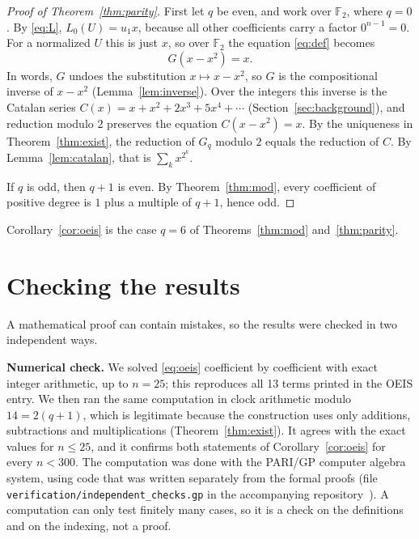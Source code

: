 \documentclass[11pt,a4paper]{article}
\theoremstyle{definition}
\theoremstyle{remark}
\newcommand{\F}{\mathbb{F}}
\newcommand{\para}[1]{\par\medskip\noindent\textbf{#1}\enspace}
\begin{document}
\begin{proof}[Proof of Theorem~\ref{thm:parity}]
First let $q$ be even, and work over $\F_2$, where $q=0$. By \eqref{eq:L}, $L_0(U)=u_1x$, because all other
coefficients carry a factor $0^{n-1}=0$. For a normalized $U$ this is just $x$, so over $\F_2$ the equation
\eqref{eq:def} becomes
\[
G(x-x^2)=x .
\]
In words, $G$ undoes the substitution $x\mapsto x-x^2$, so $G$ is the compositional inverse of $x-x^2$
(Lemma~\ref{lem:inverse}). Over the integers this inverse is the Catalan series $C(x)=x+x^2+2x^3+5x^4+\cdots$
(Section~\ref{sec:background}), and reduction modulo $2$ preserves the equation $C(x-x^2)=x$. By the uniqueness in
Theorem~\ref{thm:exist}, the reduction of $G_q$ modulo $2$ equals the reduction of $C$. By Lemma~\ref{lem:catalan}, that
is $\sum_kx^{2^k}$.

If $q$ is odd, then $q+1$ is even. By Theorem~\ref{thm:mod}, every coefficient of positive degree is $1$ plus a multiple
of $q+1$, hence odd.
\end{proof}


Corollary~\ref{cor:oeis} is the case $q=6$ of Theorems~\ref{thm:mod} and~\ref{thm:parity}.

\section{Checking the results}\label{sec:checks}

A mathematical proof can contain mistakes, so the results were checked in two independent ways.

\para{Numerical check.}
We solved \eqref{eq:oeis} coefficient by coefficient with exact integer arithmetic, up to $n=25$; this
reproduces all 13 terms printed in the OEIS entry. We then ran the same computation in clock
arithmetic modulo $14=2(q+1)$, which is legitimate because the construction uses only additions,
subtractions and multiplications (Theorem~\ref{thm:exist}). It agrees with the exact values for $n\le25$, and it confirms
both statements of Corollary~\ref{cor:oeis} for every $n<300$.
The computation was done with the PARI/GP computer algebra system, using code that was written separately from the
formal proofs (file \texttt{verification/independent\_checks.gp} in the accompanying repository~\cite{repo}).
A computation can only test finitely many cases, so it is a check on the definitions and on the indexing, not a proof.
\end{document}
